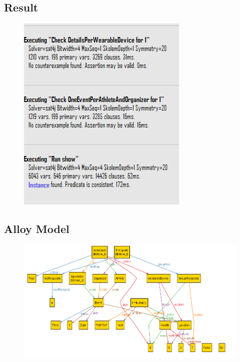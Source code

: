 \subsection{Result}
\begin{figure}[H]	\includegraphics[width=\linewidth]{./Alloy/Result.PNG}
\end{figure}
\subsection{Alloy Model}
\begin{figure}[H]	\includegraphics[width=\linewidth]{./Alloy/Final_model.PNG}
\end{figure}
